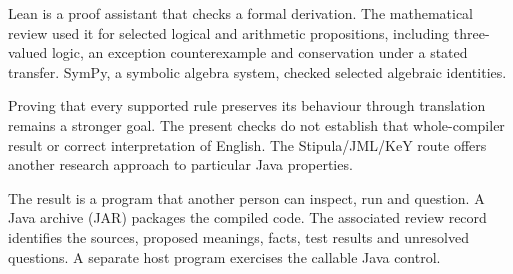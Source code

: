 Lean is a proof assistant that checks a formal derivation. The mathematical
review used it for selected logical and arithmetic propositions, including
three-valued logic, an exception counterexample and conservation under a stated
transfer. SymPy, a symbolic algebra system, checked selected algebraic identities.

\begin{MapDiagram}
\end{MapDiagram}

Proving that every supported rule preserves its behaviour through translation
remains a stronger goal. The present checks do not establish that whole-compiler
result or correct interpretation of English. The Stipula/JML/KeY route offers
another research approach to particular Java properties.

\clearpage
{}
The result is a program that another person can inspect, run and question.
A Java archive (JAR) packages the compiled code. The associated review record
identifies the sources, proposed meanings, facts, test results and unresolved
questions. A separate host program exercises the callable Java control.

\begin{MapDiagram}
\end{MapDiagram}

